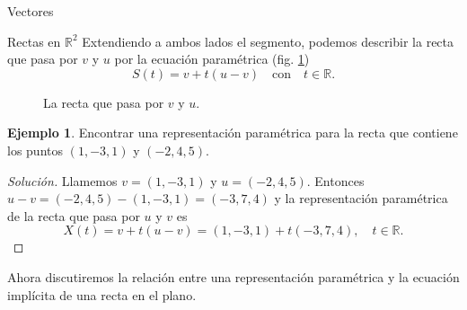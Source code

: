 \documentclass[a4paper,12pt,twoside,spanish,reqno]{amsbook}
\theoremstyle{definition}
\newtheorem{ejemplo}{Ejemplo}[section]
\theoremstyle{remark}
\newcommand{\R}{\mathbb R}
\begin{document}
\begin{chapter}{Vectores}
\begin{section}{Rectas en $\R^2$}
        Extendiendo a ambos lados el segmento, podemos describir la recta que pasa por $v$ y $u$ por la ecuación paramétrica (fig. \ref{fig-recta-entre-puntos})
        \begin{equation*}
        S(t) = v + t(u-v)\quad  \text{con}\quad t \in \R.
        \end{equation*}
        \begin{figure}[h]
            \caption{La recta que pasa por $v$ y $u$.}
            \label{fig-recta-entre-puntos}
        \end{figure} 
        
        \begin{ejemplo}
            Encontrar una representación paramétrica para la recta que contiene los puntos $(1, - 3, 1)$ y $(- 2,4,5)$.
        \end{ejemplo}	
        \begin{proof}[Solución] Llamemos $v = (1, - 3, 1)$ y $u =(- 2,4,5)$. Entonces $u-v = (- 2,4,5) - (1,-3,1) = (-3,7,4)$ y la representación paramétrica de la recta que pasa por $u$ y $v$  es 
        \begin{equation*}
            X (t) = v + t(u-v) = (1, -3,1) + t (-3, 7, 4),\quad t\in \R.
        \end{equation*}
        \end{proof}
    
        Ahora discutiremos la relación entre una representación paramétrica y la ecuación implícita de una recta en el plano.
        

\end{section}
\end{chapter}
\end{document}
